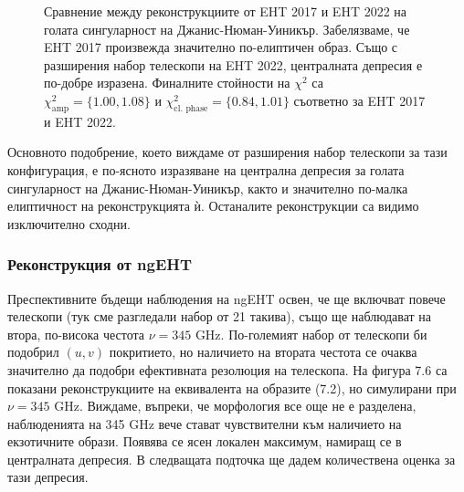 \begin{figure}[h!]
\begin{subfigure}{6cm}
	\end{subfigure}
	\label{EHTIM_JNW_2017_2022}
	\caption[Сравнение между реконструкциите от EHT 2017 и EHT 2022 на голата сингуларност на Джанис-Нюман-Уиникър]{Сравнение между реконструкциите от EHT 2017 и EHT 2022 на голата сингуларност на Джанис-Нюман-Уиникър. Забелязваме, че EHT 2017 произвежда значително по-елиптичен образ. Също с разширения набор телескопи на EHT 2022, централната депресия е по-добре изразена. Финалните стойности на $\chi^2$ са $\chi^2_\text{amp} = \{1.00, 1.08\}$ и $\chi^2_\text{cl. phase} = \{0.84, 1.01\}$ съответно за EHT 2017 и EHT 2022.} 
\end{figure}

Основното подобрение, което виждаме от разширения набор телескопи за тази конфигурация, е по-ясното изразяване на централна депресия за голата сингуларност на Джанис-Нюман-Уиникър, както и значително по-малка елиптичност на реконструкцията ѝ. Останалите реконструкции са видимо изключително сходни.  
\newpage
\subsubsection{Реконструкция от ngEHT}

Преспективните бъдещи наблюдения на ngEHT освен, че ще включват повече телескопи (тук сме разгледали набор от 21 такива), също ще наблюдават на втора, по-висока честота $\nu = 345$ GHz. По-големият набор от телескопи би подобрил $(u,v)$ покритието, но наличието на втората честота се очаква значително да подобри ефективната резолюция на телескопа. На фигура 7.6 са показани реконструкциите на еквивалента на образите (7.2), но симулирани при $\nu  =345$ GHz. Виждаме, въпреки, че морфология все още не е разделена, наблюденията на 345 GHz вече стават чувствителни към наличието на екзотичните образи. Появява се ясен локален максимум, намиращ се в централната депресия. В следващата подточка ще дадем количествена оценка за тази депресия.

